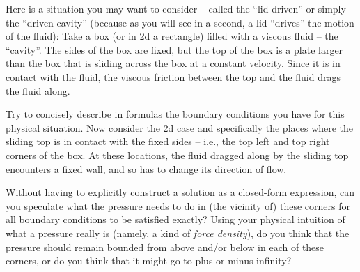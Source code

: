 \documentclass[leqno]{article}
\theoremstyle{nonumberplain}
\begin{document}
Here is a situation you may want to consider -- called the
``lid-driven'' or simply the ``driven cavity'' (because as you will
see in a second, a lid ``drives'' the motion of the fluid): Take a box
(or in 2d a rectangle) filled with a viscous fluid -- the
``cavity''. The sides of the box are fixed, but the top of the box is
a plate larger than the box that is sliding across the box at a
constant velocity. Since it is in contact with the fluid, the viscous
friction between the top and the fluid drags the fluid along.

Try to concisely describe in formulas the boundary conditions you have for this physical
situation. Now consider the 2d case and specifically the places where
the sliding top is in contact with the fixed sides -- i.e., the top
left and top right corners of the box. At these locations, the fluid
dragged along by the sliding top encounters a fixed wall, and so has
to change its direction of flow.

Without having to explicitly construct a solution as a closed-form
expression, can you speculate what the pressure needs to do in (the
vicinity of) these
corners for all boundary conditions to be satisfied exactly? Using
your physical intuition of what a pressure really is (namely, a kind of
\textit{force density}), do you think that the pressure should remain bounded
from above and/or below in each of these corners, or do you think that
it might go to plus or minus infinity?
\end{document}
